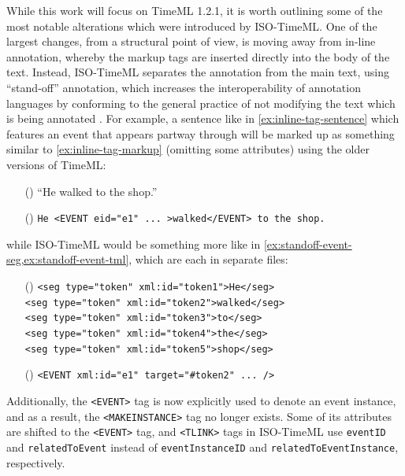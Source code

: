 \documentclass[a4paper,12pt,leqno,twoside]{article}
\newcommand{\ipp}{(\refstepcounter{equation}\theequation)}
\begin{document}
While this work will focus on TimeML 1.2.1, it is worth outlining some of the most notable alterations which were introduced by ISO-TimeML. One of the largest changes, from a structural point of view, is moving away from in-line annotation, whereby the markup tags are inserted directly into the body of the text. Instead, ISO-TimeML separates the annotation from the main text, using ``stand-off'' annotation, which increases the interoperability of annotation languages by conforming to the general practice of not modifying the text which is being annotated \citep[p. 395]{pustejovsky2010iso}. For example, a sentence like in \cref{ex:inline-tag-sentence} which features an event that appears partway through will be marked up as something similar to \cref{ex:inline-tag-markup} (omitting some attributes) using the older versions of TimeML:
\begin{itemize}
	\item[\ipp\label{ex:inline-tag-sentence}] ``He walked to the shop.''
	\item[\ipp\label{ex:inline-tag-markup}] \verb|He <EVENT eid="e1" ... >walked</EVENT> to the shop.|
\end{itemize}
while ISO-TimeML would be something more like in \cref{ex:standoff-event-seg,ex:standoff-event-tml}, which are each in separate files:
\begin{itemize}
	\item[\ipp\label{ex:standoff-event-seg}] \verb|<seg type="token" xml:id="token1">He</seg>|\\\verb|<seg type="token" xml:id="token2">walked</seg>|\\\verb|<seg type="token" xml:id="token3">to</seg>|\\\verb|<seg type="token" xml:id="token4">the</seg>|\\\verb|<seg type="token" xml:id="token5">shop</seg>|
	\item[\ipp\label{ex:standoff-event-tml}] \verb|<EVENT xml:id="e1" target="#token2" ... />|
\end{itemize}
Additionally, the \verb|<EVENT>| tag is now explicitly used to denote an event instance, and as a result, the \verb|<MAKEINSTANCE>| tag no longer exists. Some of its attributes are shifted to the \verb|<EVENT>| tag, and \verb|<TLINK>| tags in ISO-TimeML use \texttt{eventID} and \texttt{relatedToEvent} instead of \texttt{eventInstanceID} and \texttt{relatedToEventInstance}, respectively.
\end{document}
